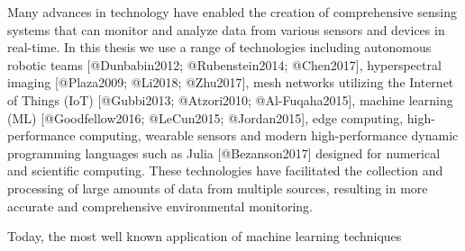 Many advances in technology have enabled the creation of comprehensive sensing systems that can monitor and analyze data from various sensors and devices in real-time. In this thesis we use a range of technologies including autonomous robotic teams [@Dunbabin2012; @Rubenstein2014; @Chen2017], hyperspectral imaging [@Plaza2009; @Li2018; @Zhu2017], mesh networks utilizing the Internet of Things (IoT) [@Gubbi2013; @Atzori2010; @Al-Fuqaha2015], machine learning (ML) [@Goodfellow2016; @LeCun2015; @Jordan2015], edge computing, high-performance computing,  wearable sensors and modern high-performance dynamic programming languages such as Julia [@Bezanson2017] designed for numerical and scientific computing. These technologies have facilitated the collection and processing of large amounts of data from multiple sources, resulting in more accurate and comprehensive environmental monitoring.



Today, the most well known application of machine learning techniques





